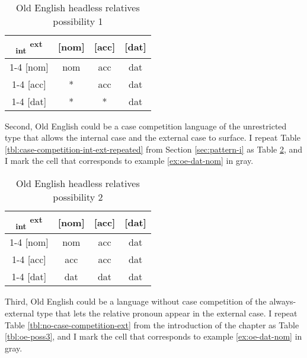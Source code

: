  \begin{table}[ht]
   \center
   \caption{Old English headless relatives possibility 1}
   \begin{tabular}{c|c|c|c}
     \toprule
     \textsubscript{\ac{int}} \textsuperscript{\ac{ext}}
            & [\ac{nom}]
            & [\ac{acc}]
            & [\ac{dat}]
            \\ \cmidrule{1-4}
        [\ac{nom}]
            & \ac{nom}
            & \ac{acc}
            & \cellcolor{LG}\ac{dat}
            \\ \cmidrule{1-4}
        [\ac{acc}]
            & *
            & \ac{acc}
            & \ac{dat}
            \\ \cmidrule{1-4}
        [\ac{dat}]
            & *
            & *
            & \ac{dat}
            \\
      \bottomrule
   \end{tabular}
     \label{tbl:oe-poss1}
 \end{table}

Second, Old English could be a case competition language of the unrestricted type that allows the internal case and the external case to surface. I repeat Table \ref{tbl:case-competition-int-ext-repeated} from Section \ref{sec:pattern-i} as Table \ref{tbl:oe-poss2}, and I mark the cell that corresponds to example \ref{ex:oe-dat-nom} in gray.

  \begin{table}[ht]
    \center
    \caption{Old English headless relatives possibility 2}
    \begin{tabular}{c|c|c|c}
      \toprule
      \textsubscript{\ac{int}} \textsuperscript{\ac{ext}}
             & [\ac{nom}]
             & [\ac{acc}]
             & [\ac{dat}]
             \\ \cmidrule{1-4}
         [\ac{nom}]
             & \ac{nom}
             & \ac{acc}
             & \cellcolor{LG}\ac{dat}
             \\ \cmidrule{1-4}
         [\ac{acc}]
             & \ac{acc}
             & \ac{acc}
             & \ac{dat}
             \\ \cmidrule{1-4}
         [\ac{dat}]
             & \ac{dat}
             & \ac{dat}
             & \ac{dat}
             \\
       \bottomrule
    \end{tabular}
      \label{tbl:oe-poss2}
  \end{table}

Third, Old English could be a language without case competition of the always-external type that lets the relative pronoun appear in the external case. I repeat Table \ref{tbl:no-case-competition-ext} from the introduction of the chapter as Table \ref{tbl:oe-poss3}, and I mark the cell that corresponds to example \ref{ex:oe-dat-nom} in gray.

